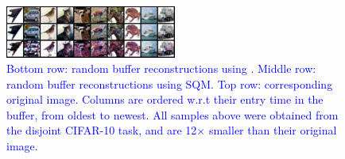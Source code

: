 \documentclass[colorinlistoftodos]{article} %
\newcommand\mynotesLC[1]{\textcolor{blue}{#1}}
\begin{document}
\begin{figure}[h!]
    \centering
    \includegraphics[width=0.5\textwidth]{figs/recon_comp.pdf}
    \caption{\mynotesLC{Bottom row: random buffer reconstructions using \cite{riemer2018learning}. Middle row: random buffer reconstructions using SQM. Top row: corresponding original image. Columns are ordered w.r.t their entry time in the buffer, from oldest to newest. All samples above were obtained from the disjoint CIFAR-10 task, and are 12$\times$ smaller than their original image.}}
    \label{fig:dist_comparison}
\end{figure}



\end{document}
